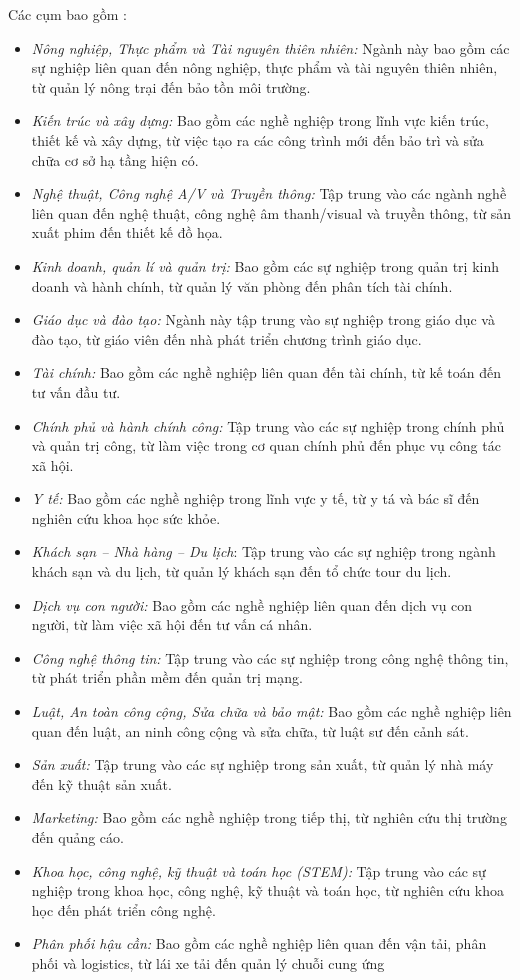 Các cụm bao gồm :
\begin{itemize}
    \item \textit{Nông nghiệp, Thực phẩm và Tài nguyên thiên nhiên:} Ngành này bao gồm các sự nghiệp liên quan đến nông nghiệp, thực phẩm và tài nguyên thiên nhiên, từ quản lý nông trại đến bảo tồn môi trường.
    \item \textit{Kiến trúc và xây dựng:} Bao gồm các nghề nghiệp trong lĩnh vực kiến trúc, thiết kế và xây dựng, từ việc tạo ra các công trình mới đến bảo trì và sửa chữa cơ sở hạ tầng hiện có.
    \item \textit{Nghệ thuật, Công nghệ A/V và Truyền thông:} Tập trung vào các ngành nghề liên quan đến nghệ thuật, công nghệ âm thanh/visual và truyền thông, từ sản xuất phim đến thiết kế đồ họa.
    \item \textit{Kinh doanh, quản lí và quản trị:} Bao gồm các sự nghiệp trong quản trị kinh doanh và hành chính, từ quản lý văn phòng đến phân tích tài chính.
    \item \textit{Giáo dục và đào tạo:} Ngành này tập trung vào sự nghiệp trong giáo dục và đào tạo, từ giáo viên đến nhà phát triển chương trình giáo dục.
    \item \textit{Tài chính:} Bao gồm các nghề nghiệp liên quan đến tài chính, từ kế toán đến tư vấn đầu tư.
    \item \textit{Chính phủ và hành chính công:} Tập trung vào các sự nghiệp trong chính phủ và quản trị công, từ làm việc trong cơ quan chính phủ đến phục vụ công tác xã hội.
    \item \textit{Y tế:} Bao gồm các nghề nghiệp trong lĩnh vực y tế, từ y tá và bác sĩ đến nghiên cứu khoa học sức khỏe.
    \item \textit{Khách sạn – Nhà hàng – Du lịch}: Tập trung vào các sự nghiệp trong ngành khách sạn và du lịch, từ quản lý khách sạn đến tổ chức tour du lịch.
    \item \textit{Dịch vụ con người:} Bao gồm các nghề nghiệp liên quan đến dịch vụ con người, từ làm việc xã hội đến tư vấn cá nhân.
    \item \textit{Công nghệ thông tin:} Tập trung vào các sự nghiệp trong công nghệ thông tin, từ phát triển phần mềm đến quản trị mạng.
    \item \textit{Luật, An toàn công cộng, Sửa chữa và bảo mật:} Bao gồm các nghề nghiệp liên quan đến luật, an ninh công cộng và sửa chữa, từ luật sư đến cảnh sát.
    \item \textit{Sản xuất:} Tập trung vào các sự nghiệp trong sản xuất, từ quản lý nhà máy đến kỹ thuật sản xuất.
    \item \textit{Marketing:} Bao gồm các nghề nghiệp trong tiếp thị, từ nghiên cứu thị trường đến quảng cáo.
    \item \textit{Khoa học, công nghệ, kỹ thuật và toán học (STEM):} Tập trung vào các sự nghiệp trong khoa học, công nghệ, kỹ thuật và toán học, từ nghiên cứu khoa học đến phát triển công nghệ.
    \item \textit{Phân phối hậu cần:} Bao gồm các nghề nghiệp liên quan đến vận tải, phân phối và logistics, từ lái xe tải đến quản lý chuỗi cung ứng
\end{itemize}
